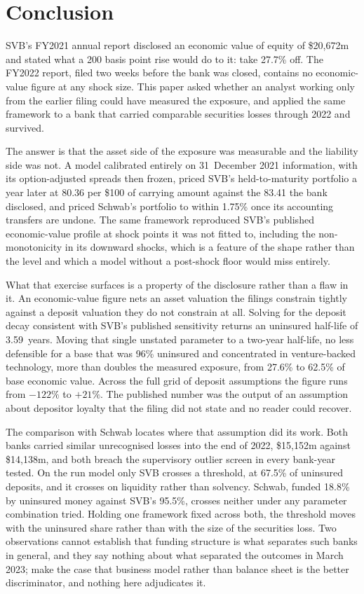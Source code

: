 \section{Conclusion}
\label{sec:conclusion}

SVB's FY2021 annual report disclosed an economic value of equity of \$20,672m and
stated what a 200 basis point rise would do to it: take 27.7\% off. The FY2022
report, filed two weeks before the bank was closed, contains no economic-value figure
at any shock size. This paper asked whether an analyst working only from the earlier
filing could have measured the exposure, and applied the same framework to a bank
that carried comparable securities losses through 2022 and survived.

The answer is that the asset side of the exposure was measurable and the liability
side was not. A model calibrated entirely on 31~December 2021 information, with its
option-adjusted spreads then frozen, priced SVB's held-to-maturity portfolio a year
later at 80.36 per \$100 of carrying amount against the 83.41 the bank disclosed, and
priced Schwab's portfolio to within 1.75\% once its accounting transfers are undone.
The same framework reproduced SVB's published economic-value profile at shock points
it was not fitted to, including the non-monotonicity in its downward shocks, which is
a feature of the shape rather than the level and which a model without a post-shock
floor would miss entirely.

What that exercise surfaces is a property of the disclosure rather than a flaw in it.
An economic-value figure nets an asset valuation the filings constrain tightly against
a deposit valuation they do not constrain at all. Solving for the deposit decay
consistent with SVB's published sensitivity returns an uninsured half-life of
3.59~years. Moving that single unstated parameter to a two-year half-life, no less defensible for
a base that was 96\% uninsured and concentrated in venture-backed technology, more
than doubles the measured exposure, from 27.6\% to
62.5\% of base economic value. Across the full grid of deposit assumptions the figure
runs from $-122\%$ to $+21\%$. The published number was the output of an assumption
about depositor loyalty that the filing did not state and no reader could recover.

The comparison with Schwab locates where that assumption did its work. Both banks
carried similar unrecognised losses into the end of 2022, \$15,152m against
\$14,138m, and both breach the supervisory outlier screen in every bank-year tested.
On the run model only SVB crosses a threshold, at 67.5\% of uninsured deposits, and
it crosses on liquidity rather than solvency. Schwab, funded 18.8\% by uninsured
money against SVB's 95.5\%, crosses neither under any parameter combination tried.
Holding one framework fixed across both, the threshold moves with the uninsured share
rather than with the size of the securities loss. Two observations cannot establish
that funding structure is what separates such banks in general, and they say nothing
about what separated the outcomes in March 2023; \citet{KellyRose2025} make the case
that business model rather than balance sheet is the better discriminator, and
nothing here adjudicates it.

